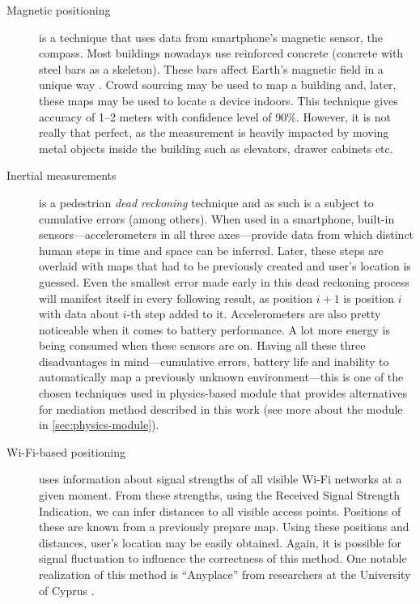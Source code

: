 \begin{description}
	\item[Magnetic positioning] is a technique that uses data from smartphone's magnetic sensor, the compass. Most buildings nowadays use reinforced concrete (concrete with steel bars as a skeleton). These bars affect Earth's magnetic field in a unique way \cite{Haverinen:magnetic}. Crowd sourcing may be used to map a building and, later, these maps may be used to locate a device indoors. This technique gives accuracy of 1--2 meters with confidence level of 90\%. However, it is not really that perfect, as the measurement is heavily impacted by moving metal objects inside the building such as elevators, drawer cabinets etc.
	
	\item[Inertial measurements] is a pedestrian \emph{dead reckoning} technique and as such is a subject to cumulative errors (among others). When used in a smartphone, built-in sensors---accelerometers in all three axes---provide data from which distinct human steps in time and space can be inferred. Later, these steps are overlaid with maps that had to be previously created and user's location is guessed. Even the smallest error made early in this dead reckoning process will manifest itself in every following result, as position $i+1$ is position $i$ with data about $i$-th step added to it. Accelerometers are also pretty noticeable when it comes to battery performance. A lot more energy is being consumed when these sensors are on. Having all these three disadvantages in mind---cumulative errors, battery life and inability to automatically map a previously unknown environment---this is one of the chosen techniques used in physics-based module that provides alternatives for mediation method described in this work (see more about the module in \cref{sec:physics-module}).
	
	\item[Wi-Fi-based positioning] uses information about signal strengths of all visible Wi-Fi networks at a given moment. From these strengths, using the Received Signal Strength Indication, we can infer distances to all visible access points. Positions of these are known from a previously prepare map. Using these positions and distances, user's location may be easily obtained. Again, it is possible for signal fluctuation to influence the correctness of this method. One notable realization of this method is ``Anyplace'' from researchers at the University of Cyprus \cite{Anyplace}.
	

\end{description}
